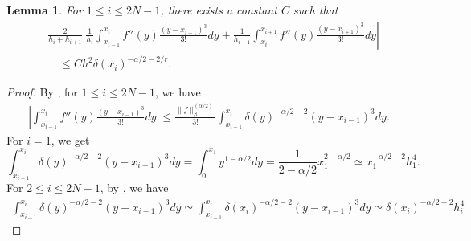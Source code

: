 \documentclass{amsart}
\newtheorem{lemma}[theorem]{Lemma}
\theoremstyle{definition}
\theoremstyle{remark}
\numberwithin{equation}{section}
\begin{document}
\begin{lemma} \label{lmm:trucerr2d2f}
For $1\le i \le 2N-1$,
  there exists a constant \(C\) such that
    \begin{equation*}
      \begin{aligned}
        & \frac{2}{h_i + h_{i+1}} \left| \frac{1}{h_i} \int_{x_{i-1}}^{x_{i}} f''(y) \frac{(y-x_{i-1})^3}{3!} dy + \frac{1}{h_{i+1}} \int_{x_{i}}^{x_{i+1}} f''(y) \frac{(y-x_{i+1})^3}{3!} dy \right| \\
         & \quad \le C h^2 \delta(x_i)^{-\alpha/2-2/r} .
      \end{aligned}
    \end{equation*}
\end{lemma}
\begin{proof} \label{prf:trucerr2d2f}
  By , for \(1 \le i \le 2N-1\), we have
  \begin{equation*}
    \begin{aligned}
      \left|\int_{x_{i-1}}^{x_{i}} f''(y)\frac{(y-x_{i-1})^3}{3!} dy \right|  \le \frac{\|f\|_{\beta}^{(\alpha/2)}}{3!} \int_{x_{i-1}}^{x_{i}} \delta(y)^{-\alpha/2-2} (y-x_{i-1})^3 dy .
    \end{aligned}
  \end{equation*}
  For \(i=1\), we get
  \begin{equation*}
    \int_{x_{i-1}}^{x_{i}} \delta(y)^{-\alpha/2-2} (y-x_{i-1})^3 dy
    = \int_{0}^{x_{1}} y^{1-\alpha/2} dy
    = \frac{1}{2-\alpha/2} x_1^{2-\alpha/2} \simeq x_1^{-\alpha/2-2} h_1^4 .
  \end{equation*}
  For \(2\le i \le 2N-1\), by , we have
  \begin{equation*}
    \begin{aligned}
      \int_{x_{i-1}}^{x_{i}} \delta(y)^{-\alpha/2-2} (y-x_{i-1})^3 dy 
        \simeq \int_{x_{i-1}}^{x_{i}} \delta(x_i)^{-\alpha/2-2} (y-x_{i-1})^3 dy
        \simeq \delta(x_i)^{-\alpha/2-2} h_i^4
    \end{aligned}
  \end{equation*}

\end{proof}
\end{document}
